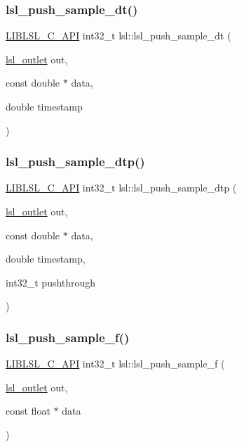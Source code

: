 \subsubsection{\texorpdfstring{lsl\+\_\+push\+\_\+sample\+\_\+dt()}{lsl\_push\_sample\_dt()}}
{\footnotesize\ttfamily \hyperlink{lsl__cpp_8h_aafd0ef1813e8be84a1420c4f1df64615}{L\+I\+B\+L\+S\+L\+\_\+\+C\+\_\+\+A\+PI} int32\+\_\+t lsl\+::lsl\+\_\+push\+\_\+sample\+\_\+dt (\begin{DoxyParamCaption}\item[{\hyperlink{namespacelsl_abcf512b0f66dacf86c10b165995fd50b}{lsl\+\_\+outlet}}]{out,  }\item[{const double $\ast$}]{data,  }\item[{double}]{timestamp }\end{DoxyParamCaption})}

\mbox{\label{namespacelsl_aa6064248da7a261b46185ec9ffd12ba3}} 
\subsubsection{\texorpdfstring{lsl\+\_\+push\+\_\+sample\+\_\+dtp()}{lsl\_push\_sample\_dtp()}}
{\footnotesize\ttfamily \hyperlink{lsl__cpp_8h_aafd0ef1813e8be84a1420c4f1df64615}{L\+I\+B\+L\+S\+L\+\_\+\+C\+\_\+\+A\+PI} int32\+\_\+t lsl\+::lsl\+\_\+push\+\_\+sample\+\_\+dtp (\begin{DoxyParamCaption}\item[{\hyperlink{namespacelsl_abcf512b0f66dacf86c10b165995fd50b}{lsl\+\_\+outlet}}]{out,  }\item[{const double $\ast$}]{data,  }\item[{double}]{timestamp,  }\item[{int32\+\_\+t}]{pushthrough }\end{DoxyParamCaption})}

\mbox{\label{namespacelsl_a001aa3637915875c44c379c07c55fb3a}} 
\subsubsection{\texorpdfstring{lsl\+\_\+push\+\_\+sample\+\_\+f()}{lsl\_push\_sample\_f()}}
{\footnotesize\ttfamily \hyperlink{lsl__cpp_8h_aafd0ef1813e8be84a1420c4f1df64615}{L\+I\+B\+L\+S\+L\+\_\+\+C\+\_\+\+A\+PI} int32\+\_\+t lsl\+::lsl\+\_\+push\+\_\+sample\+\_\+f (\begin{DoxyParamCaption}\item[{\hyperlink{namespacelsl_abcf512b0f66dacf86c10b165995fd50b}{lsl\+\_\+outlet}}]{out,  }\item[{const float $\ast$}]{data }\end{DoxyParamCaption})}

